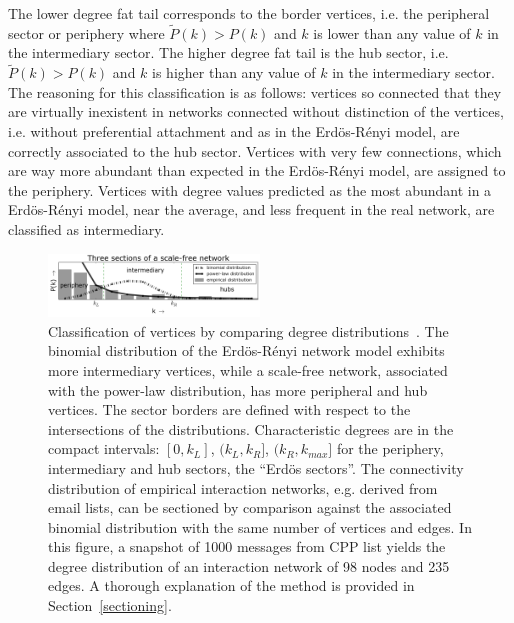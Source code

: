 \documentclass[%
aip,
jmp,%
amsmath,amssymb,
reprint,%
]{revtex4-1}
\begin{document}
The lower degree fat tail corresponds to the border vertices, i.e. the peripheral sector or periphery where $\widetilde{P}(k)>P(k)$ and $k$ is lower than any value of $k$ in the intermediary sector.
The higher degree fat tail is the hub sector, i.e. $\widetilde{P}(k)>P(k)$ and $k$ is higher than any value of $k$ in the intermediary sector. The reasoning for this classification is as follows: vertices so connected that they are virtually inexistent in networks connected without distinction of the vertices, i.e. without preferential attachment and as in the Erd\"os-R\'enyi model, are correctly associated to the hub sector. Vertices with very few connections, which are way more abundant than expected in the Erd\"os-R\'enyi model, are assigned to the periphery. Vertices with degree values predicted as the most abundant in a Erd\"os-R\'enyi model, near the average, and less frequent in the real network, are classified as intermediary.

\begin{figure}[!h]
\centering
\includegraphics[width=0.5\textwidth]{figs/fser__}
\caption{Classification of vertices by comparing degree
distributions~\cite{3setores}.
The binomial distribution of the Erd\"os-R\'enyi network model exhibits more intermediary vertices, while a scale-free network, associated with the power-law distribution, has more peripheral and hub vertices. The sector borders are defined with respect to the intersections of the distributions. Characteristic degrees are in the compact intervals: $[0,k_L]$, $(k_L,k_R]$, $(k_R,k_{max}]$ for the periphery, intermediary and hub sectors, the ``Erd\"os sectors''.
The connectivity distribution of empirical interaction networks, e.g. derived from email lists, can be sectioned by comparison against the associated binomial distribution with the same number of vertices and edges. In this figure, a snapshot of 1000 messages from CPP list yields the degree distribution of an interaction network of 98 nodes and 235 edges. A thorough explanation of the method is provided in Section~\ref{sectioning}.}
\label{fig:setores}
\end{figure}
\end{document}
